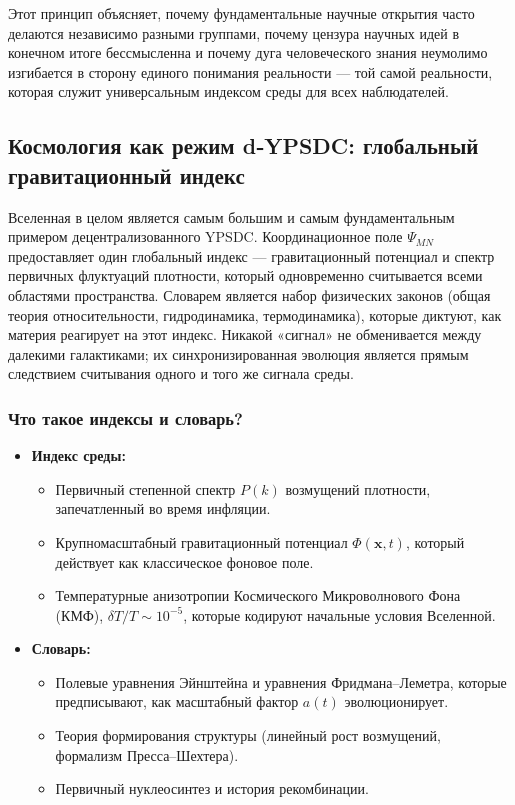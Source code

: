 \documentclass[11pt,a4paper]{article}
\begin{document}
	Этот принцип объясняет, почему фундаментальные научные открытия часто
	делаются независимо разными группами, почему цензура научных идей
	в конечном итоге бессмысленна и почему дуга человеческого знания неумолимо
	изгибается в сторону единого понимания реальности — той самой реальности,
	которая служит универсальным индексом среды для всех наблюдателей.
	
	\subsection{Космология как режим d‑YPSDC: глобальный гравитационный индекс}
	\label{subsec:cosmology-dypsdc}
	
	Вселенная в целом является самым большим и самым фундаментальным примером
	децентрализованного YPSDC.  Координационное поле \(\Psi_{MN}\) предоставляет
	один глобальный индекс — гравитационный потенциал и спектр первичных
	флуктуаций плотности, который одновременно считывается всеми
	областями пространства.  Словарем является набор физических законов (общая
	теория относительности, гидродинамика, термодинамика), которые диктуют, как материя
	реагирует на этот индекс.  Никакой «сигнал» не обменивается между далекими
	галактиками; их синхронизированная эволюция является прямым следствием
	считывания одного и того же сигнала среды.
	
	\subsubsection*{Что такое индексы и словарь?}
	\begin{itemize}[leftmargin=*]
		\item \textbf{Индекс среды:}
		\begin{itemize}
			\item Первичный степенной спектр \(P(k)\) возмущений
			плотности, запечатленный во время инфляции.
			\item Крупномасштабный гравитационный потенциал \(\Phi(\mathbf{x},t)\),
			который действует как классическое фоновое поле.
			\item Температурные анизотропии Космического Микроволнового
			Фона (КМФ), \(\delta T / T \sim 10^{-5}\), которые кодируют
			начальные условия Вселенной.
		\end{itemize}
		\item \textbf{Словарь:}
		\begin{itemize}
			\item Полевые уравнения Эйнштейна и уравнения Фридмана–Леметра,
			которые предписывают, как масштабный фактор \(a(t)\) эволюционирует.
			\item Теория формирования структуры (линейный рост
			возмущений, формализм Пресса–Шехтера).
			\item Первичный нуклеосинтез и история рекомбинации.
		\end{itemize}
	\end{itemize}
	
\end{document}
